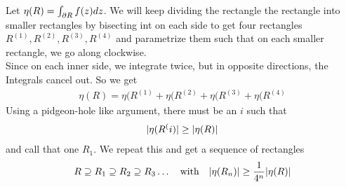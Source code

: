 Let $\eta(R) = \int_{\partial R}f(z) dz$. We will keep dividing the rectangle the rectangle into smaller rectangles by bisecting int on each side to get four rectangles $R^{(1)}, R^{(2)}, R^{(3)}, R^{(4)}$ and parametrize them such that on each smaller rectangle, we go along clockwise.\\

Since on each inner side, we integrate twice, but in opposite directions, the Integrals cancel out. So we get
\begin{align*}
	\eta(R) = \eta(R^{(1)} + \eta(R^{(2)} + \eta(R^{(3)} + \eta(R^{(4)}
\end{align*}
Using a pidgeon-hole like argument, there must be an $i$ such that 
\begin{align*}
	\vert\eta(R^(i)\vert \geq \vert\eta(R)\vert
\end{align*}
and call that one $R_1$. We repeat this and get a sequence of rectangles
\begin{align*}
	R \supseteq R_1 \supseteq R_2 \supseteq R_3 \ldots \quad \text{with} \quad \vert\eta(R_n)\vert \geq \frac{1}{4^n} \vert\eta(R)\vert
\end{align*}

